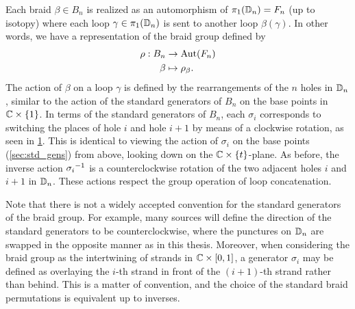 Each braid $\beta\in B_n$ is realized as an automorphism of $\pi_1(\mathbb{D}_n) = F_n$ (up to isotopy) where each loop $\gamma\in\pi_1(\mathbb{D}_n)$ is sent to another loop $\beta(\gamma)$. In other words, we have a representation of the braid group defined by
\begin{align}
    \rho: B_n &\to \textrm{Aut}\!\left( F_n \right) \\
    \beta &\mapsto \rho_\beta.
\end{align}
The action of $\beta$ on a loop $\gamma$ is defined by the rearrangements of the $n$ holes in $\mathbb{D}_n$, similar to the action of the standard generators of $B_n$ on the base points in $\mathbb{C}\times\left\{ 1 \right\}$. In terms of the standard generators of $B_n$, each $\sigma_i$ corresponds to switching the places of hole $i$ and hole $i+1$ by means of a clockwise rotation, as seen in \cref{fig:sigma_on_Dn}. This is identical to viewing the action of $\sigma_i$ on the base points (\cref{sec:std_gens}) from above, looking down on the $\mathbb{C}\times\left\{ t \right\}$-plane. As before, the inverse action ${ \sigma_i }^{-1}$ is a counterclockwise rotation of the two adjacent holes $i$ and $i+1$ in $\mathbb{D}_n$. These actions respect the group operation of loop concatenation.

Note that there is not a widely accepted convention for the standard generators of the braid group. For example, many sources will define the direction of the standard generators to be counterclockwise, where the punctures on $\mathbb{D}_n$ are swapped in the opposite manner as in this thesis. Moreover, when considering the braid group as the intertwining of strands in $\mathbb{C}\times \left[ 0,1 \right]$, a generator $\sigma_i$ may be defined as overlaying the $i$-th strand in front of the $(i+1)$-th strand rather than behind. This is a matter of convention, and the choice of the standard braid permutations is equivalent up to inverses.


\begin{figure}[htbp]
    \centering
    
    \label{fig:sigma_on_Dn}
\end{figure}

